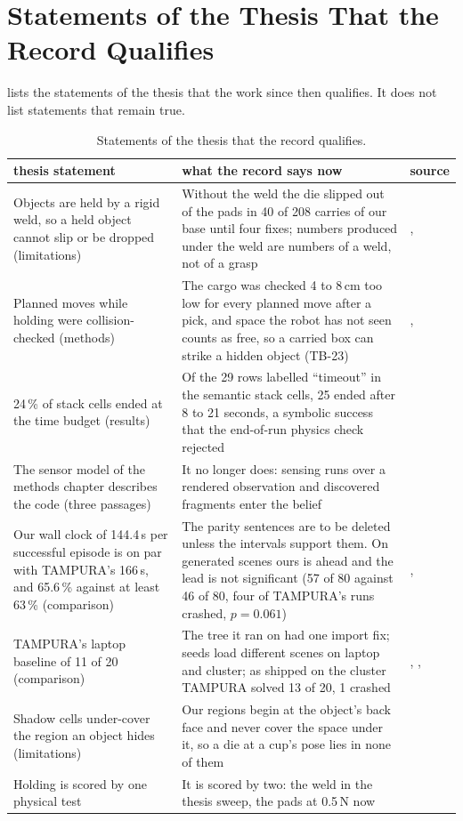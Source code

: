 \section{Statements of the Thesis That the Record Qualifies}
\label{sec:qualify}

 lists the statements of the thesis \cite{alassiri2026thesis}
that the work since then qualifies. It does not list statements that remain true.

\begin{table}[tbp]
\centering
\small
\begin{tabularx}{\textwidth}{@{}P{3.6cm}Yl@{}}
\toprule
thesis statement & what the record says now & source \\
\midrule
Objects are held by a rigid weld, so a held object cannot slip or be dropped
(limitations) &
Without the weld the die slipped out of the pads in 40 of 208 carries of our base
until four fixes; numbers produced under the weld are numbers of a weld, not of a
grasp & ,  \\
Planned moves while holding were collision-checked (methods) &
The cargo was checked 4 to 8\,cm too low for every planned move after a pick, and
space the robot has not seen counts as free, so a carried box can strike a hidden
object (TB-23) &
,  \\
24\,\% of stack cells ended at the time budget (results) &
Of the 29 rows labelled ``timeout'' in the semantic stack cells, 25 ended after 8 to
21 seconds, a symbolic success that the end-of-run physics check rejected &  \\
The sensor model of the methods chapter describes the code (three passages) &
It no longer does: sensing runs over a rendered observation and discovered
fragments enter the belief &  \\
Our wall clock of 144.4\,s per successful episode is on par with TAMPURA's 166\,s,
and 65.6\,\% against at least 63\,\% (comparison) &
The parity sentences are to be deleted unless the intervals support them. On
generated scenes ours is ahead and the lead is not significant (57 of 80 against 46
of 80, four of TAMPURA's runs crashed, $p = 0.061$) & ,  \\
TAMPURA's laptop baseline of 11 of 20 (comparison) &
The tree it ran on had one import fix; seeds load different scenes on laptop and
cluster; as shipped on the cluster TAMPURA solved 13 of 20, 1 crashed & ,
,  \\
Shadow cells under-cover the region an object hides (limitations) &
Our regions begin at the object's back face and never cover the space under it, so
a die at a cup's pose lies in none of them &  \\
Holding is scored by one physical test &
It is scored by two: the weld in the thesis sweep, the pads at 0.5\,N now &  \\
\bottomrule
\end{tabularx}
\caption[Statements of the thesis that the record qualifies.]{Statements of the thesis
that the record qualifies. }
\label{tab:qualify}
\end{table}

